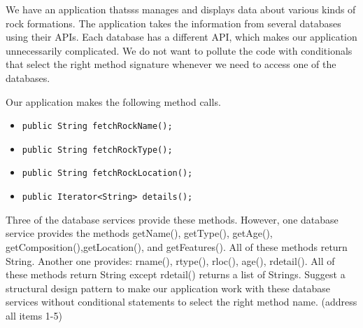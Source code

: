 \question[12] We have an application thatsss manages and displays data about various kinds of rock formations. The application takes the information from several databases using their APIs. Each database has a different API, which makes our application unnecessarily complicated. We do not want to pollute the code with conditionals that select the right method signature whenever we need to access one of the databases.

Our application makes the following method calls.
\begin{itemize}[label={}]
    \item \begin{verbatim} 
public String fetchRockName();
\end{verbatim} 
    \item \begin{verbatim} 
public String fetchRockType();
    \end{verbatim}
    \item \begin{verbatim} 
public String fetchRockLocation();
    \end{verbatim}
    \item \begin{verbatim} 
public Iterator<String> details();
    \end{verbatim}
\end{itemize}

Three of the database services provide these methods.
However, one database service provides the methods getName(), getType(), getAge(), getComposition(),getLocation(), and getFeatures(). All of these methods return String. 
Another one provides: rname(), rtype(), rloc(), age(), rdetail().  All of these methods return String except rdetail() returns a list of Strings.
Suggest a structural design pattern to make our application work with these database services without conditional statements to select the right method name.
(address all items 1-5)

\clearpage
